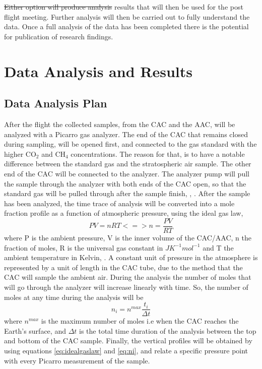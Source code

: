 \documentclass[a4paper,12pt,twoside]{article}
\providecommand{\DIFaddtex}[1]{{\protect\color{blue}\uwave{#1}}} %
\providecommand{\DIFdeltex}[1]{{\protect\color{red}\sout{#1}}}                      %
\providecommand{\DIFaddbegin}{} %
\providecommand{\DIFaddend}{} %
\providecommand{\DIFdelend}{} %
\providecommand{\DIFadd}[1]{\texorpdfstring{\DIFaddtex{#1}}{#1}} %
\providecommand{\DIFdel}[1]{\texorpdfstring{\DIFdeltex{#1}}{}} %
\newcommand{\DIFaddincludegraphics}[2][]{{\color{blue}\fbox{\DIFOincludegraphics[#1]{#2}}}} %
\DeclareRobustCommand{\DIFaddbegin}{\DIFOaddbegin \let\includegraphics\DIFaddincludegraphics} %
\DeclareRobustCommand{\DIFaddend}{\DIFOaddend \let\includegraphics\DIFOincludegraphics} %
\DeclareRobustCommand{\DIFdelend}{\DIFOaddend \let\includegraphics\DIFOincludegraphics} %
\begin{document}
\DIFdel{Either option will produce analysis }\DIFdelend \DIFaddbegin \DIFadd{The analysis }\DIFaddend results that will then be used for the post flight meeting. Further analysis will then be carried out to fully understand the data. Once a full analysis of the data has been completed there is the potential for publication of research findings.



\pagebreak
\section{Data Analysis and Results}

\subsection{Data Analysis Plan}

After the flight the collected samples, from the CAC and the AAC, will be analyzed with a Picarro gas analyzer. The end of the CAC that remains closed during sampling, will be opened first, and connected to the gas standard with the higher CO$_2$ and CH$_4$ concentrations. The reason for that, is to have a notable difference between the standard gas and the stratospheric air sample. The other end of the CAC will be connected to the analyzer. The analyzer pump will pull the sample through the analyzer with both ends of the CAC open, so that the standard gas will be pulled through after the sample finish, \cite{Karion}, \cite{Olivier}.
After the sample has been analyzed, the time trace of analysis will be converted into a mole fraction profile as a function of atmospheric pressure, using the ideal gas law,
\begin{equation}
    PV = nRT <=> n = \frac{PV}{RT}
    \label{eq:idealgaslaw}
\end{equation}
where P is the ambient pressure, V is the inner volume of the CAC/AAC, n the fraction of moles, R is the universal gas constant in $J K^{-1} mol^{-1}$ and T the ambient temperature in Kelvin, \cite{Olivier}. 
A constant unit of pressure in the atmosphere is represented by a unit of length in the CAC tube, due to the method that the CAC will sample the ambient air.
During the analysis the number of moles that will go through the analyzer will increase linearly with time. So, the number of moles at any time during the analysis will be
\begin{equation}
    n_i = n^{max}\frac{t_i}{\Delta t}
    \label{eq:ni}
\end{equation}
where $n^{max}$ is the maximum number of moles i.e when the CAC reaches the Earth's surface, and $\Delta t$  is the total time duration of the analysis between the top and bottom of the CAC sample.   
Finally, the vertical profiles will be obtained by using equations \ref{eq:idealgaslaw} and \ref{eq:ni}, and relate a specific pressure point with every Picarro measurement of the sample.   
\end{document}
